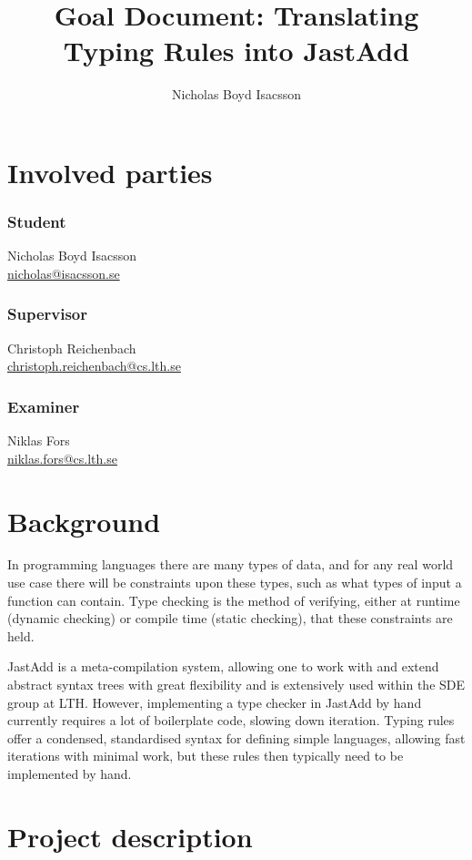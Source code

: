 \documentclass{article}
\title{Goal Document: Translating Typing Rules into JastAdd}
\author{Nicholas Boyd Isacsson}
\begin{document}
\maketitle

\section{Involved parties}
\subsubsection*{Student}
  Nicholas Boyd Isacsson \\
  \href{mailto:nicholas@isacsson.se}{nicholas@isacsson.se}

\subsubsection*{Supervisor}
  Christoph Reichenbach \\
  \href{mailto:christoph.reichenbach@cs.lth.se}{christoph.reichenbach@cs.lth.se}

\subsubsection*{Examiner}
  Niklas Fors \\
  \href{mailto:niklas.fors@cs.lth.se}{niklas.fors@cs.lth.se}

\section{Background}
In programming languages there are many types of data, and for any real world use case there will be constraints upon these types, such as what types of input a function can contain.
Type checking is the method of verifying, either at runtime (dynamic checking) or compile time (static checking), that these constraints are held.

JastAdd is a meta-compilation system, allowing one to work with and extend abstract syntax trees with great flexibility and is extensively used within the SDE group at LTH.
However, implementing a type checker in JastAdd by hand currently requires a lot of boilerplate code, slowing down iteration.
Typing rules offer a condensed, standardised syntax for defining simple languages, allowing fast iterations with minimal work, but these rules then typically need to be implemented by hand.


\section{Project description}
\end{document}
